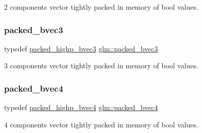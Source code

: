 2 components vector tightly packed in memory of bool values. 

\mbox{\label{group__gtc__type__aligned_gae53d997456f6336eab2450117b11163e}} 
\subsubsection{\texorpdfstring{packed\+\_\+bvec3}{packed\_bvec3}}
{\footnotesize\ttfamily typedef \hyperlink{group__gtc__type__aligned_gafad47eaff82deab03a1e8d82d2dbd046}{packed\+\_\+highp\+\_\+bvec3} \hyperlink{group__gtc__type__aligned_gae53d997456f6336eab2450117b11163e}{glm\+::packed\+\_\+bvec3}}



3 components vector tightly packed in memory of bool values. 

\mbox{\label{group__gtc__type__aligned_ga27837cfec1a5b6d6ae23961f93431403}} 
\subsubsection{\texorpdfstring{packed\+\_\+bvec4}{packed\_bvec4}}
{\footnotesize\ttfamily typedef \hyperlink{group__gtc__type__aligned_gaa7a006e26052e668a16bf3b8bd81cbef}{packed\+\_\+highp\+\_\+bvec4} \hyperlink{group__gtc__type__aligned_ga27837cfec1a5b6d6ae23961f93431403}{glm\+::packed\+\_\+bvec4}}



4 components vector tightly packed in memory of bool values. 

\mbox{\label{group__gtc__type__aligned_ga1b85bcaa9f7caaec77f3a31d35669a98}} 
